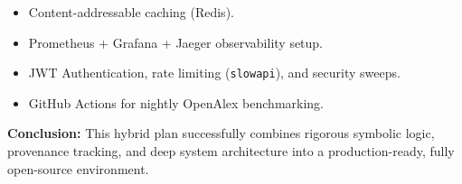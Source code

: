 \documentclass[
]{article}
\providecommand{\tightlist}{%
  \setlength{\itemsep}{0pt}\setlength{\parskip}{0pt}}
\begin{document}
\begin{itemize}
\tightlist
\item
  Content-addressable caching (Redis).
\item
  Prometheus + Grafana + Jaeger observability setup.
\item
  JWT Authentication, rate limiting (\texttt{slowapi}), and security
  sweeps.
\item
  GitHub Actions for nightly OpenAlex benchmarking.
\end{itemize}

\textbf{Conclusion:} This hybrid plan successfully combines rigorous
symbolic logic, provenance tracking, and deep system architecture into a
production-ready, fully open-source environment.
\end{document}

